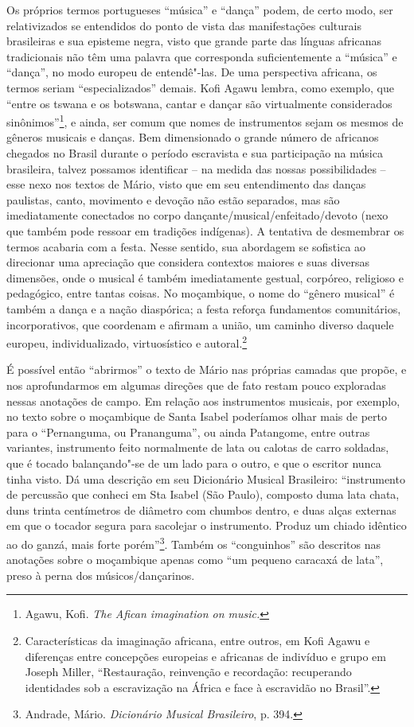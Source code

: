Os próprios termos portugueses ``música'' e ``dança'' podem, de certo
modo, ser relativizados se entendidos do ponto de vista das
manifestações culturais brasileiras e sua episteme negra, visto que
grande parte das línguas africanas tradicionais não têm uma palavra que
corresponda suficientemente a ``música'' e ``dança'', no modo europeu de
entendê"-las. De uma perspectiva africana, os termos seriam
``especializados'' demais. Kofi Agawu lembra, como exemplo, que ``entre
os tswana e os botswana, cantar e dançar são virtualmente considerados
sinônimos''\footnote{Agawu, Kofi. \emph{The Afican imagination on
  music.}}, e ainda, ser comum que nomes de instrumentos sejam os mesmos
de gêneros musicais e danças. Bem dimensionado o grande número de
africanos chegados no Brasil durante o período escravista e sua
participação na música brasileira, talvez possamos identificar -- na
medida das nossas possibilidades -- esse nexo nos textos de Mário, visto
que em seu entendimento das danças paulistas, canto, movimento e devoção
não estão separados, mas são imediatamente conectados no corpo
dançante/musical/enfeitado/devoto (nexo que também pode ressoar em
tradições indígenas). A tentativa de desmembrar os termos acabaria com a
festa. Nesse sentido, sua abordagem se sofistica ao direcionar uma
apreciação que considera contextos maiores e suas diversas dimensões,
onde o musical é também imediatamente gestual, corpóreo, religioso e
pedagógico, entre tantas coisas. No moçambique, o nome do ``gênero
musical'' é também a dança e a nação diaspórica; a festa reforça
fundamentos comunitários, incorporativos, que coordenam e afirmam a
união, um caminho diverso daquele europeu, individualizado,
virtuosístico e autoral.\footnote{Características da imaginação
  africana, entre outros, em Kofi Agawu e diferenças entre concepções
  europeias e africanas de indivíduo e grupo em Joseph Miller,
  ``Restauração, reinvenção e recordação: recuperando identidades sob a
  escravização na África e face à escravidão no Brasil''.}

É possível então ``abrirmos'' o texto de Mário nas próprias camadas que
propõe, e nos aprofundarmos em algumas direções que de fato restam pouco
exploradas nessas anotações de campo. Em relação aos instrumentos
musicais, por exemplo, no texto sobre o moçambique de Santa Isabel
poderíamos olhar mais de perto para o ``Pernanguma, ou Prananguma'', ou
ainda Patangome, entre outras variantes, instrumento feito normalmente
de lata ou calotas de carro soldadas, que é tocado balançando"-se de um
lado para o outro, e que o escritor nunca tinha visto. Dá uma descrição
em seu Dicionário Musical Brasileiro: ``instrumento de percussão que
conheci em Sta Isabel (São Paulo), composto duma lata chata, duns trinta
centímetros de diâmetro com chumbos dentro, e duas alças externas em que
o tocador segura para sacolejar o instrumento. Produz um chiado idêntico
ao do ganzá, mais forte porém''\footnote{Andrade, Mário.
  \emph{Dicionário Musical Brasileiro}, p. 394.}. Também os
``conguinhos'' são descritos nas anotações sobre o moçambique apenas
como ``um pequeno caracaxá de lata'', preso à perna dos
músicos/dançarinos.

